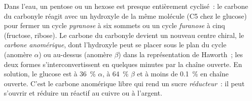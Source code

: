 \begin{proposition}\label{prop:b1:carbohydrates:rings}
Dans l'eau, un pentose ou un hexose est presque entièrement cyclisé~: le
carbone du carbonyle réagit avec un hydroxyle de la même molécule (C5
chez le glucose) pour fermer un cycle \emph{pyranose} à six sommets ou
un cycle \emph{furanose} à cinq (fructose, ribose). Le carbone du
carbonyle devient un nouveau centre chiral, le \emph{carbone
anomérique}, dont l'hydroxyle peut se placer sous le plan du cycle
(anomère $\alpha$) ou au-dessus (anomère $\beta$) dans la représentation
de Haworth~; les deux formes s'interconvertissent en quelques minutes
par la chaîne ouverte. En solution, le glucose est à \qty{36}{\%}
$\alpha$, à \qty{64}{\%} $\beta$ et à moins de \qty{0.1}{\%} en chaîne
ouverte. C'est le carbone anomérique libre qui rend un sucre
\emph{réducteur}~: il peut s'ouvrir et réduire un réactif au cuivre ou à
l'argent.
\end{proposition}

